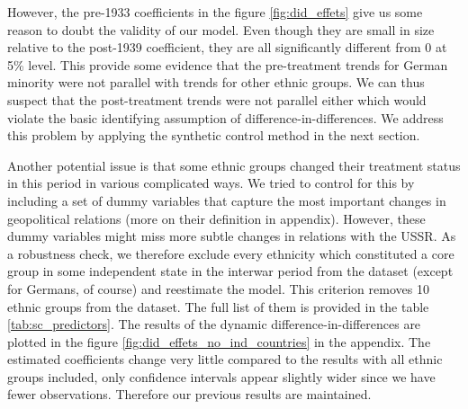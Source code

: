  
 
 
However, the pre-1933 coefficients in the figure \ref{fig:did_effets} give us some reason to doubt the
validity of our model. Even though they are small in size relative to the post-1939 coefficient, they are all  significantly different from 0 at 5\% level.
This provide some evidence that the pre-treatment trends for German minority were not parallel with trends for other ethnic groups. We can thus suspect that the post-treatment trends were not parallel either which
would violate the basic identifying assumption of
difference-in-differences.
We address this problem by applying the synthetic control method in the next section. 
 
Another potential issue is that some ethnic groups changed their treatment status in this period in various complicated ways. 
We tried to control for this by including a set of dummy variables  that capture the most important changes in geopolitical relations (more on their definition in appendix). 
However, these dummy variables might miss  more subtle changes in relations with the USSR. As a robustness check, we therefore exclude every ethnicity which constituted a core group in some independent state in the interwar period from the dataset (except for Germans, of course) and reestimate the model. This criterion removes 10 ethnic groups from the dataset. The full list of them is provided in the table \ref{tab:sc_predictors}. The results of the dynamic difference-in-differences are plotted in the figure \ref{fig:did_effets_no_ind_countries} in the appendix. The estimated coefficients change  very little compared to the results with all ethnic groups included, only confidence intervals appear slightly wider since we have fewer observations. Therefore our previous results are maintained. 

